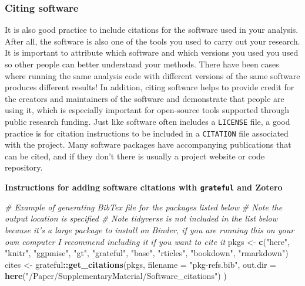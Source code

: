 \documentclass[]{elsarticle} %
\newenvironment{Shaded}{\begin{snugshade}}{\end{snugshade}}
\newcommand{\CommentTok}[1]{\textcolor[rgb]{0.56,0.35,0.01}{\textit{#1}}}
\newcommand{\DataTypeTok}[1]{\textcolor[rgb]{0.13,0.29,0.53}{#1}}
\newcommand{\KeywordTok}[1]{\textcolor[rgb]{0.13,0.29,0.53}{\textbf{#1}}}
\newcommand{\NormalTok}[1]{#1}
\newcommand{\OperatorTok}[1]{\textcolor[rgb]{0.81,0.36,0.00}{\textbf{#1}}}
\newcommand{\StringTok}[1]{\textcolor[rgb]{0.31,0.60,0.02}{#1}}
\begin{document}
\hypertarget{citing-software}{%
\subsubsection{Citing software}\label{citing-software}}

It is also good practice to include citations for the software used in your analysis. After all, the software is also one of the tools you used to carry out your research. It is important to attribute which software and which versions you used you used so other people can better understand your methods. There have been cases where running the same analysis code with different versions of the same software produces different results! In addition, citing software helps to provide credit for the creators and maintainers of the software and demonstrate that people are using it, which is especially important for open-source tools supported through public research funding. Just like software often includes a \texttt{LICENSE} file, a good practice is for citation instructions to be included in a \texttt{CITATION} file associated with the project. Many software packages have accompanying publications that can be cited, and if they don't there is usually a project website or code repository.

\textbf{Instructions for adding software citations with \texttt{grateful} and Zotero}

\begin{Shaded}
\begin{Highlighting}[]
\CommentTok{# Example of generating BibTex file for the packages listed below}
\CommentTok{# Note the output location is specified }
\CommentTok{# Note tidyverse is not included in the list below because it's a large package to install on Binder, if you are running this on your own computer I recommend including it if you want to cite it}
\NormalTok{pkgs <-}\StringTok{ }\KeywordTok{c}\NormalTok{(}\StringTok{"here"}\NormalTok{, }\StringTok{"knitr"}\NormalTok{, }\StringTok{"ggpmisc"}\NormalTok{, }\StringTok{"gt"}\NormalTok{, }\StringTok{"grateful"}\NormalTok{, }\StringTok{"base"}\NormalTok{, }\StringTok{"rticles"}\NormalTok{, }\StringTok{"bookdown"}\NormalTok{, }
          \StringTok{"rmarkdown"}\NormalTok{)}
\NormalTok{cites <-}\StringTok{ }\NormalTok{grateful}\OperatorTok{::}\KeywordTok{get_citations}\NormalTok{(pkgs, }\DataTypeTok{filename =} \StringTok{"pkg-refs.bib"}\NormalTok{,}
                    \DataTypeTok{out.dir =}  \KeywordTok{here}\NormalTok{(}\StringTok{"/Paper/SupplementaryMaterial/Software_citations"}\NormalTok{) )}
\end{Highlighting}
\end{Shaded}
\end{document}
